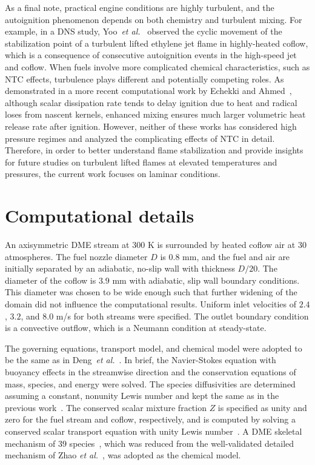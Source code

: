 \documentclass[review,3p,times]{elsarticle}
\begin{document}
\textcolor{Rv2}{As a final note, practical engine conditions are highly turbulent, and the autoignition phenomenon depends on both chemistry and turbulent mixing.  For example, in a DNS study, Yoo~\emph{et al.}~\cite{yoo11} observed the cyclic movement of the stabilization point of a turbulent lifted ethylene jet flame in highly-heated coflow, which is a consequence of consecutive autoignition events in the high-speed jet and coflow.  When fuels involve more complicated chemical characteristics, such as NTC effects, turbulence plays different and potentially competing roles. As demonstrated in a more recent computational work by Echekki and Ahmed~\cite{echekki15}, although scalar dissipation rate tends to delay ignition due to heat and radical loses from nascent kernels, enhanced mixing ensures much larger volumetric heat release rate after ignition.  However, neither of these works has considered high pressure regimes and analyzed the complicating effects of NTC in detail.  Therefore, in order to better understand flame stabilization and provide insights for future studies on turbulent lifted flames at elevated temperatures and pressures, the current work focuses on laminar conditions.}

 

\section{Computational details} \label{sec:computation}

An axisymmetric DME stream at $300$ K is surrounded by heated coflow air at $30$ atmospheres.  The fuel nozzle diameter $D$ is $0.8$ mm, and the fuel and air are initially separated by an adiabatic, no-slip wall with thickness $D/20$.  The diameter of the coflow is $3.9$ mm with adiabatic, slip wall boundary conditions.  This diameter was chosen to be wide enough such that further widening of the domain did not influence the computational results.  Uniform inlet velocities of $2.4$, $3.2$, and $8.0$ m/s for both streams were specified.  The outlet boundary condition is a convective outflow, which is a Neumann condition at steady-state.

The governing equations, transport model, and chemical model were adopted to be the same as in Deng~\emph{et al.}~\cite{deng15}.  In brief, the Navier-Stokes equation with buoyancy effects in the streamwise direction and the conservation equations of mass, species, and energy were solved.  The species diffusivities are determined assuming a constant, nonunity Lewis number \textcolor{Rv1}{and kept the same as in the previous work~\cite{deng15}}.  The conserved scalar mixture fraction $Z$ is specified as unity and zero for the fuel stream and coflow, respectively, and is computed by solving a conserved scalar transport equation with unity Lewis number~\cite{pitsch98b}.  A DME skeletal mechanism of $39$ species~\cite{bhagatwala15}, which was reduced from the well-validated detailed mechanism of Zhao \emph{et al.}~\cite{zhao08}, was adopted as the chemical model.
\end{document}
